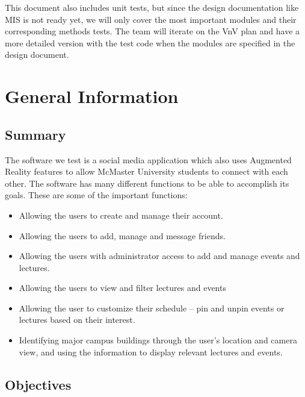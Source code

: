 \documentclass[12pt, titlepage]{article}
\begin{document}
This document also includes unit tests, but since the design documentation like MIS is not ready yet, we will only cover the most important modules and their corresponding methods tests. The team will iterate on the VnV plan and have a more detailed version with the test code when the modules are specified in the design document.

\section{General Information}

\subsection{Summary}
  
The software we test is a social media application which also uses Augmented Reality features to allow McMaster University students to connect with each other. The software has many different functions to be able to accomplish its goals. These are some of the important functions:

 \begin{itemize}
     \item  Allowing the users to create and manage their account.

     \item  Allowing the users to add, manage and message friends.

     \item  Allowing the users with administrator access to add and manage events and lectures.

     \item  Allowing the users to view and filter lectures and events 
     
     \item Allowing the user to customize their schedule -- pin and unpin events or lectures based on their interest.

     \item  Identifying major campus buildings through the user's location and camera view, and using the information to display relevant lectures and events.

 \end{itemize}

 

\subsection{Objectives}
\end{document}

